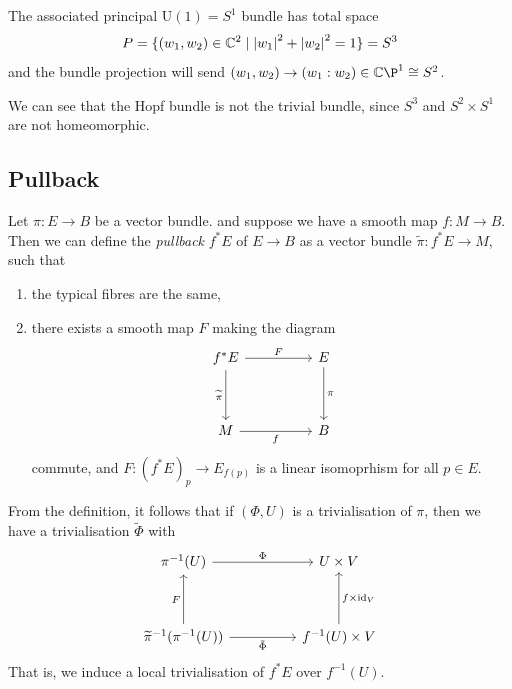 \documentclass{article}
\begin{document}
The associated principal \(\mathrm U(1) = S^1\) bundle has total space
\[P = \{(w_1, w_2) \in \mathbb{C}^2 \mid \abs{w_1}^2 + \abs{w_2}^2 = 1\} = S^3\]
and the bundle projection will send \((w_1, w_2) \to (w_1:w_2) \in \C\P^1 \cong S^2\).

We can see that the Hopf bundle is not the trivial bundle, since \(S^3\) and \(S^2 \times S^1\) are not homeomorphic.

\subsection{Pullback}

\begin{definition}
    [pullback]
    Let \(\pi : E \to B\) be a vector bundle. and suppose we have a smooth map \(f : M \to B\). Then we can define the \emph{pullback} \(f^*E\) of \(E \to B\) as a vector bundle \(\widetilde \pi : f^*E \to M\), such that
    \begin{enumerate}
        \item the typical fibres are the same,
        \item there exists a smooth map \(F\) making the diagram
        \[\begin{tikzcd}
            {f^*E} && E \\
            \\
            M && B
            \arrow["F", from=1-1, to=1-3]
            \arrow["\pi", from=1-3, to=3-3]
            \arrow["\widetilde\pi"', from=1-1, to=3-1]
            \arrow["f"', from=3-1, to=3-3]
        \end{tikzcd}\]
        commute, and \(F : (f^*E)_p \to E_{f(p)}\) is a linear isomoprhism for all \(p \in E\).
    \end{enumerate}
\end{definition}

From the definition, it follows that if \((\Phi, U)\) is a trivialisation of \(\pi\), then we have a trivialisation \(\tilde\Phi\) with
\[\begin{tikzcd}
	{\pi^{-1}(U)} && {U \times V} \\
	\\
	{\widetilde\pi^{-1}(\pi^{-1}(U))} && {f^{-1}(U)\times V}
	\arrow["\Phi", from=1-1, to=1-3]
	\arrow["F", from=3-1, to=1-1]
	\arrow["{f \times \id_V}"', from=3-3, to=1-3]
	\arrow["\tilde\Phi"', from=3-1, to=3-3]
\end{tikzcd}\]
That is, we induce a local trivialisation of \(f^*E\) over \(f^{-1}(U)\).
\end{document}
